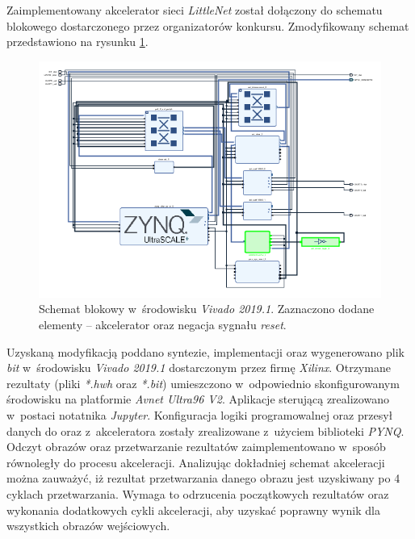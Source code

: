 \label{ch:sterowanie}
Zaimplementowany akcelerator sieci \emph{LittleNet} został dołączony do schematu blokowego dostarczonego przez organizatorów konkursu.
Zmodyfikowany schemat przedstawiono na rysunku \ref{fig:vivado}. 
\begin{figure}
    \centering
    \includegraphics[width=0.9\linewidth]{images/vivado.png}
    \caption{Schemat blokowy w~środowisku \emph{Vivado 2019.1}. Zaznaczono dodane elementy -- akcelerator oraz negacja sygnału \emph{reset}.}
    \label{fig:vivado}
\end{figure}

Uzyskaną modyfikacją poddano syntezie, implementacji oraz wygenerowano plik \emph{bit} w~środowisku \emph{Vivado 2019.1} dostarczonym przez firmę \emph{Xilinx}.
Otrzymane rezultaty (pliki \emph{*.hwh} oraz \emph{*.bit}) umieszczono w~odpowiednio skonfigurowanym środowisku na platformie \emph{Avnet Ultra96 V2}.
Aplikacje sterującą zrealizowano w~postaci notatnika \emph{Jupyter}.
Konfiguracja logiki programowalnej oraz przesył danych do oraz z~akceleratora zostały zrealizowane z~użyciem biblioteki \emph{PYNQ}. 
Odczyt obrazów oraz przetwarzanie rezultatów zaimplementowano w~sposób równoległy do procesu akceleracji.
Analizując dokładniej schemat akceleracji można zauważyć, iż rezultat przetwarzania danego obrazu jest uzyskiwany po 4 cyklach przetwarzania.
Wymaga to odrzucenia początkowych rezultatów oraz wykonania dodatkowych cykli akceleracji, aby uzyskać poprawny wynik dla wszystkich obrazów wejściowych.


